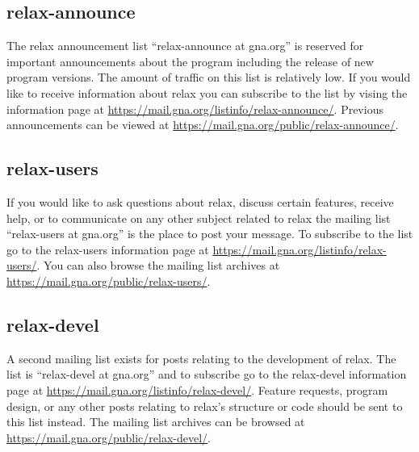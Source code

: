 \subsection{relax-announce}

The relax announcement list ``relax-announce at gna.org'' is reserved for important announcements about the program including the release of new program versions.  The amount of traffic on this list is relatively low.  If you would like to receive information about relax you can subscribe to the list by vising the information page at \href{https://mail.gna.org/listinfo/relax-announce/}{https://mail.gna.org/listinfo/relax-announce/}.  Previous announcements can be viewed at \href{https://mail.gna.org/public/relax-announce/}{https://mail.gna.org/public/relax-announce/}.


\subsection{relax-users}

If you would like to ask questions about relax, discuss certain features, receive help, or to communicate on any other subject related to relax the mailing list ``relax-users at gna.org'' is the place to post your message.  To subscribe to the list go to the relax-users information page at \href{https://mail.gna.org/listinfo/relax-users/}{https://mail.gna.org/listinfo/relax-users/}.  You can also browse the mailing list archives at \href{https://mail.gna.org/public/relax-users/}{https://mail.gna.org/public/relax-users/}.


\subsection{relax-devel}

A second mailing list exists for posts relating to the development of relax.  The list is ``relax-devel at gna.org'' and to subscribe go to the relax-devel information page at \href{https://mail.gna.org/listinfo/relax-devel/}{https://mail.gna.org/listinfo/relax-devel/}.  Feature requests, program design, or any other posts relating to relax's structure or code should be sent to this list instead.  The mailing list archives can be browsed at \href{https://mail.gna.org/public/relax-devel/}{https://mail.gna.org/public/relax-devel/}.


